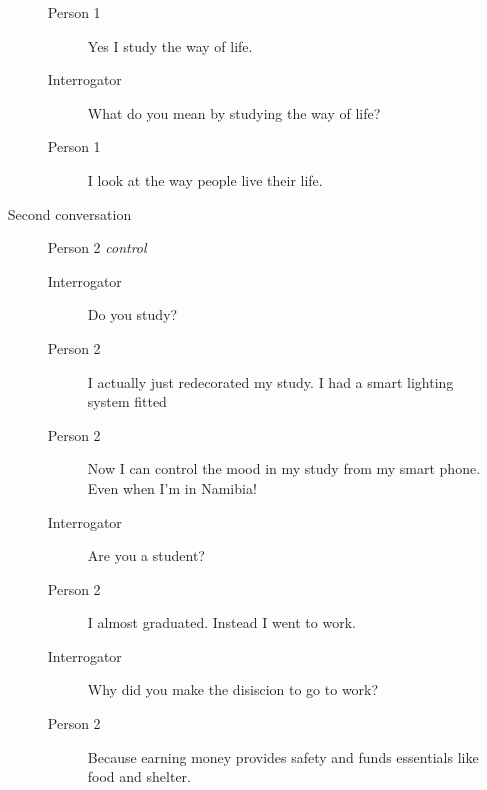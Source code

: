 \begin{itemize}
\begin{description}
\begin{description}
               \item [Person 1] Yes I study the way of life.
               \item [Interrogator] What do you mean by studying the way of life?
               \item [Person 1] I look at the way people live their life.
            \end{description}
         \item [Second conversation] Person 2 \textit{control}
            \begin{description}
               \item [Interrogator] Do you study?
               \item [Person 2] I actually just redecorated my study. I had a smart lighting system fitted
               \item [Person 2] Now I can control the mood in my study from my smart phone. Even when I'm in Namibia!
               \item [Interrogator] Are you a student?
               \item [Person 2] I almost graduated. Instead I went to work.
               \item [Interrogator] Why did you make the disiscion to go to work?
               \item [Person 2] Because earning money provides safety and funds essentials like food and shelter.
            \end{description}
      \end{description}


\end{itemize}
